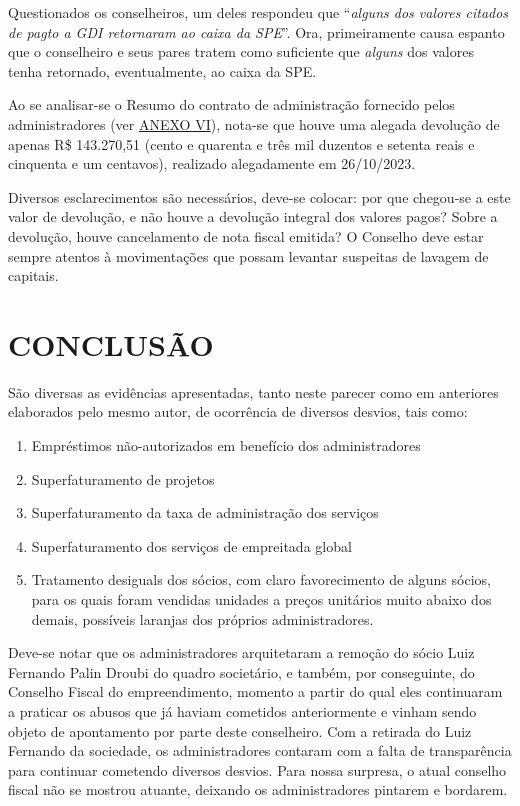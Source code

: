 \documentclass[
  letterpaper,
  DIV=11,
  numbers=noendperiod]{scrreprt}
\providecommand{\tightlist}{%
  \setlength{\itemsep}{0pt}\setlength{\parskip}{0pt}}
\begin{document}
Questionados os conselheiros, um deles respondeu que ``\emph{alguns dos
valores citados de pagto a GDI retornaram ao caixa da SPE}''. Ora,
primeiramente causa espanto que o conselheiro e seus pares tratem como
suficiente que \emph{alguns} dos valores tenha retornado, eventualmente,
ao caixa da SPE.

Ao se analisar-se o Resumo do contrato de administração fornecido pelos
administradores (ver \hyperref[anexo-vi]{ANEXO VI}), nota-se que houve
uma alegada devolução de apenas R\$ 143.270,51 (cento e quarenta e três
mil duzentos e setenta reais e cinquenta e um centavos), realizado
alegadamente em 26/10/2023.

Diversos esclarecimentos são necessários, deve-se colocar: por que
chegou-se a este valor de devolução, e não houve a devolução integral
dos valores pagos? Sobre a devolução, houve cancelamento de nota fiscal
emitida? O Conselho deve estar sempre atentos à movimentações que possam
levantar suspeitas de lavagem de capitais.


\chapter{CONCLUSÃO}\label{conclusuxe3o}

São diversas as evidências apresentadas, tanto neste parecer como em
anteriores elaborados pelo mesmo autor, de ocorrência de diversos
desvios, tais como:

\begin{enumerate}
\def\labelenumi{\arabic{enumi}.}
\tightlist
\item
  Empréstimos não-autorizados em benefício dos administradores
\item
  Superfaturamento de projetos
\item
  Superfaturamento da taxa de administração dos serviços
\item
  Superfaturamento dos serviços de empreitada global
\item
  Tratamento desiguals dos sócios, com claro favorecimento de alguns
  sócios, para os quais foram vendidas unidades a preços unitários muito
  abaixo dos demais, possíveis laranjas dos próprios administradores.
\end{enumerate}

Deve-se notar que os administradores arquitetaram a remoção do sócio
Luiz Fernando Palin Droubi do quadro societário, e também, por
conseguinte, do Conselho Fiscal do empreendimento, momento a partir do
qual eles continuaram a praticar os abusos que já haviam cometidos
anteriormente e vinham sendo objeto de apontamento por parte deste
conselheiro. Com a retirada do Luiz Fernando da sociedade, os
administradores contaram com a falta de transparência para continuar
cometendo diversos desvios. Para nossa surpresa, o atual conselho fiscal
não se mostrou atuante, deixando os administradores pintarem e bordarem.
\end{document}
